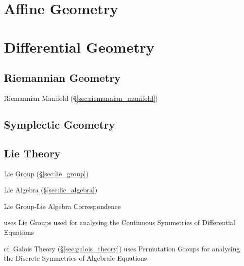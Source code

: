 \section{Affine Geometry}\label{sec:affine_geometry}

\section{Differential Geometry}\label{sec:differential_geometry}

\subsection{Riemannian Geometry}\label{sec:riemannian_geometry}

Riemannian Manifold (\S\ref{sec:riemannian_manifold})



\subsection{Symplectic Geometry}\label{sec:symplectic_geometry}

\subsection{Lie Theory}\label{sec:lie_theory}

Lie Group (\S\ref{sec:lie_group})

Lie Algebra (\S\ref{sec:lie_algebra})

Lie Group-Lie Algebra Correspondence

uses Lie Groups used for analysing the Continuous Symmetries of
Differential Equations %

cf. Galois Theory (\S\ref{sec:galois_theory}) uses Permutation Groups
for analysing the Discrete Symmetries of Algebraic Equations %



